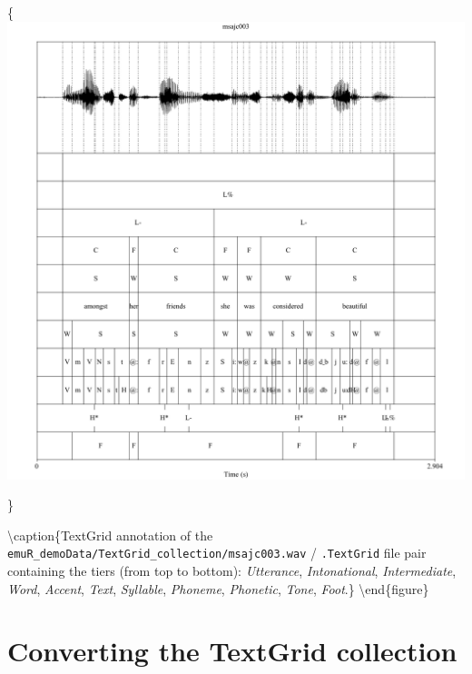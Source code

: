 \documentclass[]{book}
\theoremstyle{definition}
\theoremstyle{definition}
\theoremstyle{definition}
\theoremstyle{remark}
\begin{document}
\{\centering \includegraphics[width=0.85\linewidth]{pics/msajc003_praat}

\}

\textbackslash{}caption\{TextGrid annotation of the
\texttt{emuR\_demoData/TextGrid\_collection/msajc003.wav} /
\texttt{.TextGrid} file pair containing the tiers (from top to bottom):
\emph{Utterance}, \emph{Intonational}, \emph{Intermediate}, \emph{Word},
\emph{Accent}, \emph{Text}, \emph{Syllable}, \emph{Phoneme},
\emph{Phonetic}, \emph{Tone}, \emph{Foot}.\}\label{fig:msajc003-praatTG}
\textbackslash{}end\{figure\}

\hypertarget{converting-the-textgrid-collection}{%
\section{Converting the TextGrid
collection}\label{converting-the-textgrid-collection}}
\end{document}
